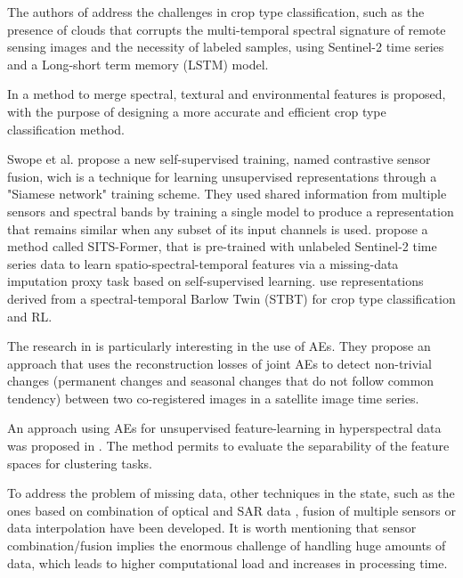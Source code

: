 \documentclass[journal,article,submit,pdftex,moreauthors]{Definitions/mdpi}
\begin{document}
The authors of \cite{Paris2020} address the challenges in crop type classification, such as the presence of clouds that
corrupts the multi-temporal spectral signature of remote sensing images and the necessity of labeled 
samples, using Sentinel-2 time series and a Long-short term memory (LSTM) model.

In \cite{He2022} a method to merge spectral, textural and environmental features is proposed, with the purpose of designing a more accurate and efficient crop 
type classification method.

Swope et al. \cite{Swope2021} propose a new self-supervised training, named contrastive sensor fusion, wich is a technique 
for learning unsupervised representations through a "Siamese network" training scheme. 
They used shared information from multiple sensors and spectral bands by training a single model to produce a representation that remains similar 
when any subset of its input channels is used. 
\cite{Yuan2022} propose a method called SITS-Former, that is pre-trained with unlabeled Sentinel-2 time series data to learn spatio-spectral-temporal features via a missing-data imputation proxy task based on self-supervised learning.
\cite{Lisaius2024} use representations derived from a spectral-temporal Barlow Twin (STBT) for crop type classification and RL.

The research in \cite{Kalinicheva2019} is particularly interesting in the use of AEs. They propose an approach that uses the reconstruction
losses of joint AEs to detect non-trivial changes (permanent changes and seasonal changes that do not follow common tendency) between two 
co-registered images in a satellite image time series.

An approach using AEs for unsupervised feature-learning in hyperspectral data was proposed in \cite{Windrim2019}.
The method permits to evaluate the separability of the feature spaces for clustering tasks.

To address the problem of missing data, other techniques in the state, such as the ones based on combination of optical and SAR data \cite{Begue2018, Orynbaikyzy2019, Kussul2017}, 
fusion of multiple sensors \cite{PierrePott2022, Heupel2018,MorenoMartinez2020} or data interpolation \cite{Russwurm2020, Kandasamy2013} have been developed.
It is worth mentioning that sensor combination/fusion implies the enormous challenge of handling huge amounts of data,
which leads to higher computational load and increases in processing time.
\end{document}
